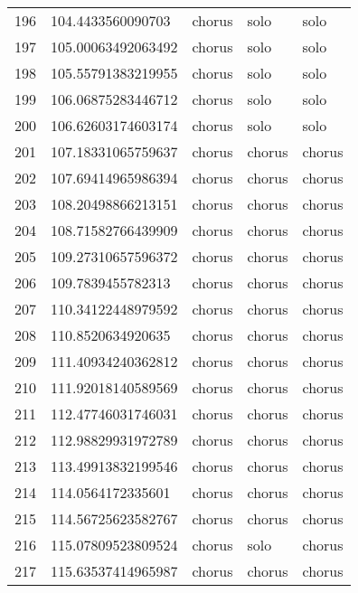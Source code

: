 \begin{table}[]
\begin{tabular}{lllll}
    196  & 104.4433560090703  & chorus       & solo            & solo           \\
    197  & 105.00063492063492 & chorus       & solo            & solo           \\
    198  & 105.55791383219955 & chorus       & solo            & solo           \\
    199  & 106.06875283446712 & chorus       & solo            & solo           \\
    200  & 106.62603174603174 & chorus       & solo            & solo           \\
    201  & 107.18331065759637 & chorus       & chorus          & chorus         \\
    202  & 107.69414965986394 & chorus       & chorus          & chorus         \\
    203  & 108.20498866213151 & chorus       & chorus          & chorus         \\
    204  & 108.71582766439909 & chorus       & chorus          & chorus         \\
    205  & 109.27310657596372 & chorus       & chorus          & chorus         \\
    206  & 109.7839455782313  & chorus       & chorus          & chorus         \\
    207  & 110.34122448979592 & chorus       & chorus          & chorus         \\
    208  & 110.8520634920635  & chorus       & chorus          & chorus         \\
    209  & 111.40934240362812 & chorus       & chorus          & chorus         \\
    210  & 111.92018140589569 & chorus       & chorus          & chorus         \\
    211  & 112.47746031746031 & chorus       & chorus          & chorus         \\
    212  & 112.98829931972789 & chorus       & chorus          & chorus         \\
    213  & 113.49913832199546 & chorus       & chorus          & chorus         \\
    214  & 114.0564172335601  & chorus       & chorus          & chorus         \\
    215  & 114.56725623582767 & chorus       & chorus          & chorus         \\
    216  & 115.07809523809524 & chorus       & solo            & chorus         \\
    217  & 115.63537414965987 & chorus       & chorus          & chorus         \\

\end{tabular}
\end{table}
